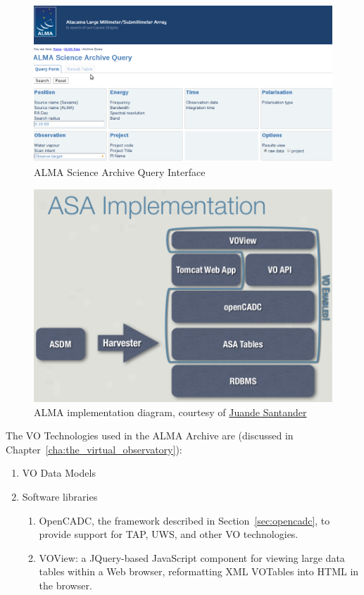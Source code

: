 \begin{figure}
\centering
\includegraphics[width=\textwidth]{images/aq.png}
\caption{ALMA Science Archive Query Interface}
\label{fig:asaqueryif}
\end{figure}

\begin{figure}
\centering
\includegraphics[height=8cm]{images/asa_implementation.png}
\caption{ALMA implementation diagram, courtesy of   \href{http://amiga.iaa.es/FCKeditor/UserFiles/File/VOandALMAarchive_web.pdf}{Juande Santander}}
\label{fig:asa_implementation}
\end{figure}


The VO Technologies used in the ALMA Archive are (discussed in Chapter~\ref{cha:the_virtual_observatory}):

\begin{enumerate}
\item VO Data Models
\item Software libraries
  \begin{enumerate}
    \item OpenCADC, the framework described in Section~\ref{sec:opencadc}, to provide support for TAP, UWS, and other VO technologies.
    \item VOView: a JQuery-based JavaScript component for viewing large data tables within a Web browser, reformatting XML VOTables into HTML in the browser.
  \end{enumerate}
\end{enumerate}



